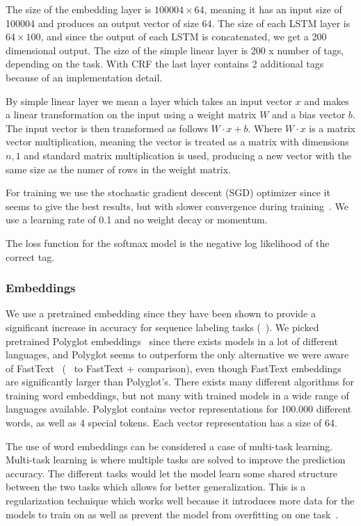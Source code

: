 The size of the embedding layer is $100004 \times 64$, meaning it has an input
size of 100004 and produces an output vector of size 64. The size of each LSTM
layer is $64 \times 100$, and since the output of each LSTM is concatenated, we
get a 200 dimensional output. The size of the simple linear layer is 200 x
number of tags, depending on the task. With CRF the last layer contains 2
additional tags because of an implementation detail.

By simple linear layer we mean a layer which takes an input vector $x$ and makes
a linear transformation on the input using a weight matrix $W$ and a bias vector
$b$. The input vector is then transformed as follows $W \cdot x + b$. Where $W
\cdot x$ is a matrix vector multiplication, meaning the vector is treated as a
matrix with dimensions $n,1$ and standard matrix multiplication is used,
producing a new vector with the same size as the numer of rows in the weight
matrix.

For training we use the stochastic gradient descent (SGD) optimizer since it
seems to give the best results, but with slower convergence during
training~\cite{yang2018design}. We use a learning rate of 0.1 and no weight
decay or momentum.

The loss function for the softmax model is the negative log likelihood of the
correct tag. 

\subsubsection{Embeddings}

We use a pretrained embedding since they have been shown to provide a
significant increase in accuracy for sequence labeling tasks
(~\cite{yang2018design}). We picked pretrained Polyglot
embeddings~\cite{polyglot:2013:ACL-CoNLL} since there exists models in a lot of
different languages, and Polyglot seems to outperform the only alternative we
were aware of FastText~\cite{joulin2016bagoftricks} (~\cite{plank2018distant} to
FastText + comparison), even though FastText embeddings are significantly larger
than Polyglot's. There exists many different algorithms for training word
embeddings, but not many with trained models in a wide range of languages
available. Polyglot contains vector representations for 100.000 different words,
as well as 4 special tokens. Each vector representation has a size of 64.

The use of word embeddings can be considered a case of multi-task learning.
Multi-task learning is where multiple tasks are solved to improve the prediction
accuracy. The different tasks would let the model learn some shared structure
between the two tasks which allows for better generalization. This is a
regularization technique which works well because it introduces more data for
the models to train on as well as prevent the model from overfitting on one
task~\cite{goodfellow2016deep}. 

